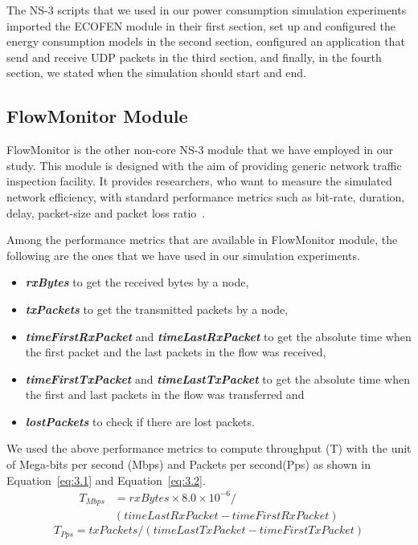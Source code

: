 The NS-3 scripts that we used in our power consumption simulation experiments imported the ECOFEN module in their first section, set up and configured the energy consumption models in the second section, configured an application that send and receive UDP packets in the third section, and finally, in the fourth section, we stated when the simulation should start and end. 

\subsection{FlowMonitor Module}
FlowMonitor is the other non-core NS-3 module that we have employed in our study. This module is designed with the aim of providing generic network traffic inspection facility. It provides researchers, who want to measure the simulated network efficiency, with standard performance metrics such as bit-rate, duration, delay, packet-size and packet loss ratio~\cite{DBLP:conf/valuetools/CarneiroFR09}.  

Among the performance metrics that are available in FlowMonitor module, the following are the ones that we have used in our simulation experiments.
\begin{itemize}
	\item \textbf{\textit{rxBytes}} to get the received bytes by a node,
	\item \textbf{\textit{txPackets}} to get the transmitted packets by a node,
	\item \textbf{\textit{timeFirstRxPacket}} and \textbf{\textit{timeLastRxPacket}} to get the absolute time when the first packet and the last packets in the flow was received,
	\item  \textbf{\textit{timeFirstTxPacket}} and \textbf{\textit{timeLastTxPacket}} to get the absolute time when the first and last packets in the flow was transferred and 
	\item \textbf{\textit{lostPackets}} to check if there are lost packets.
\end{itemize}
We used the above performance metrics to compute throughput (T) with the unit of Mega-bits per second (Mbps) and Packets per second(Pps) as shown in Equation~\ref{eq:3.1} and Equation~\ref{eq:3.2}. 
\begin{equation} \label{eq:3.1}
\begin{split}
T_{Mbps} &= rxBytes \times 8.0 \times 10^{-6} /\\
  & (timeLastRxPacket - timeFirstRxPacket)
\end{split}
\end{equation}
\begin{equation} \label{eq:3.2}
T_{Pps} = txPackets / (timeLastTxPacket - timeFirstTxPacket)
\end{equation}
